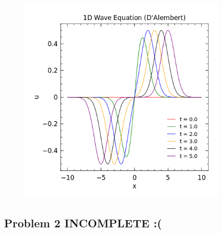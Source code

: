 \documentclass[12pt]{article}
\theoremstyle{remark}
\begin{document}
\begin{figure}[H]
\centering
\includegraphics[width=10cm]{HW3_1d.png}
\end{figure}

\newpage

\subsection*{Problem 2 INCOMPLETE :(}
\end{document}
